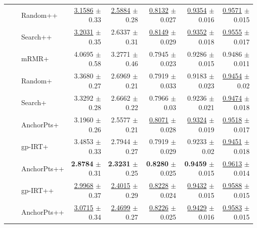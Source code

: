 \begin{longtable}{llp{}rrrrr}
 &  & Random++ & \underline{3.1586} {\scriptsize $\pm$ 0.33} & \underline{2.5884} {\scriptsize $\pm$ 0.28} & \underline{0.8132} {\scriptsize $\pm$ 0.027} & \underline{0.9354} {\scriptsize $\pm$ 0.016} & \underline{0.9571} {\scriptsize $\pm$ 0.015} \\
 &  & Search++ & \underline{3.2031} {\scriptsize $\pm$ 0.35} & 2.6337 {\scriptsize $\pm$ 0.31} & \underline{0.8149} {\scriptsize $\pm$ 0.029} & \underline{0.9352} {\scriptsize $\pm$ 0.018} & \underline{0.9555} {\scriptsize $\pm$ 0.017} \\
 &  & mRMR+ & 4.0695 {\scriptsize $\pm$ 0.58} & 3.2771 {\scriptsize $\pm$ 0.46} & 0.7945 {\scriptsize $\pm$ 0.023} & 0.9286 {\scriptsize $\pm$ 0.015} & 0.9486 {\scriptsize $\pm$ 0.011} \\
 &  & Random+ & 3.3680 {\scriptsize $\pm$ 0.27} & 2.6969 {\scriptsize $\pm$ 0.21} & 0.7919 {\scriptsize $\pm$ 0.033} & 0.9183 {\scriptsize $\pm$ 0.023} & \underline{0.9454} {\scriptsize $\pm$ 0.02} \\
 &  & Search+ & 3.3292 {\scriptsize $\pm$ 0.28} & 2.6662 {\scriptsize $\pm$ 0.22} & 0.7966 {\scriptsize $\pm$ 0.03} & 0.9236 {\scriptsize $\pm$ 0.021} & \underline{0.9474} {\scriptsize $\pm$ 0.018} \\
 &  & AnchorPts+ & 3.1960 {\scriptsize $\pm$ 0.26} & 2.5577 {\scriptsize $\pm$ 0.21} & \underline{0.8071} {\scriptsize $\pm$ 0.028} & \underline{0.9324} {\scriptsize $\pm$ 0.019} & \underline{0.9518} {\scriptsize $\pm$ 0.017} \\
 &  & gp-IRT+ & 3.4853 {\scriptsize $\pm$ 0.33} & 2.7944 {\scriptsize $\pm$ 0.27} & 0.7919 {\scriptsize $\pm$ 0.029} & 0.9233 {\scriptsize $\pm$ 0.02} & \underline{0.9451} {\scriptsize $\pm$ 0.018} \\
 &  & AnchorPts++ & \textbf{2.8784} {\scriptsize $\pm$ 0.31} & \textbf{2.3231} {\scriptsize $\pm$ 0.25} & \textbf{0.8280} {\scriptsize $\pm$ 0.025} & \textbf{0.9459} {\scriptsize $\pm$ 0.015} & \underline{0.9613} {\scriptsize $\pm$ 0.014} \\
 &  & gp-IRT++ & \underline{2.9968} {\scriptsize $\pm$ 0.37} & \underline{2.4015} {\scriptsize $\pm$ 0.29} & \underline{0.8228} {\scriptsize $\pm$ 0.024} & \underline{0.9432} {\scriptsize $\pm$ 0.015} & \underline{0.9588} {\scriptsize $\pm$ 0.015} \\
 &  & AnchorPts++ & \underline{3.0715} {\scriptsize $\pm$ 0.34} & \underline{2.4699} {\scriptsize $\pm$ 0.27} & \underline{0.8226} {\scriptsize $\pm$ 0.025} & \underline{0.9429} {\scriptsize $\pm$ 0.016} & \underline{0.9583} {\scriptsize $\pm$ 0.015} \\

\end{longtable}
